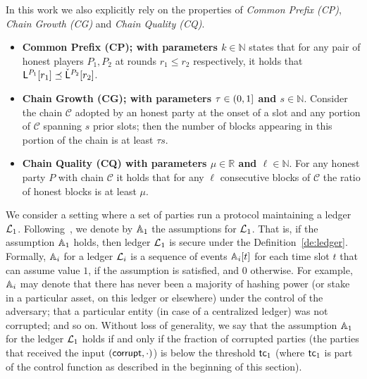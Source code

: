 In this work we also explicitly rely on the properties of \emph{Common Prefix (CP)}, \emph{Chain Growth (CG)} 
and  \emph{Chain Quality (CQ)}. 

\begin{itemize}
  \item[] {\bf Common Prefix (CP); with parameters $k\in\mathbb{N}$} 
states that for any pair of honest players  $P_1,P_2$ at rounds $r_1\leq r_2$ respectively, it holds that  ${ \mathsf{L}}^{P_1}[r_1] \preceq  {\check {\mathsf{L}}}^{P_2}[r_2] $.    
  \item[] {\bf Chain Growth (CG); with parameters $\tau\in (0,1]$ and $s\in\mathbb{N}$}. Consider the chain $\mathcal{C}$
  adopted by an honest party at the onset of a slot and any portion of $\mathcal{C}$ spanning $s$ prior slots; then the number of
  blocks appearing in this portion of the chain is at least $\tau s$.
  
  \item[] {\bf Chain Quality (CQ) with parameters $\mu\in\mathbb{R}$
and $\ell\in\mathbb{N}$}. For any honest party $P$ with chain $\mathcal{C}$  it holds that for any $\ell$ consecutive blocks of $\mathcal{C}$ the ratio of honest blocks is at least $\mu$.
 \end{itemize}



We consider a setting where a set of parties run a protocol maintaining a ledger $\mathcal{L}_1$. Following~\cite{SP:GazKiaZin19}, we denote by $\mathbb{A}_1$
the assumptions for $\mathcal{L}_1$.
 That is, if the assumption $\mathbb{A}_1$ holds, then ledger $\mathcal{L}_1$ is secure under the Definition~\ref{de:ledger}.
Formally, $\mathbb{A}_i$ for a ledger $\mathcal{L}_i$ is a sequence of events $\mathbb{A}_i[t]$ for each time slot $t$ that can assume value $1$,
if the assumption is satisfied, and $0$ otherwise.
For example, $\mathbb{A}_i$ may denote that
there has never been a majority of hashing power (or stake in a particular
asset, on this ledger or elsewhere) under the control of the adversary; that a
particular entity (in case of a centralized ledger) was not corrupted; and so
on.
Without loss of generality, we say that the assumption $\mathbb{A}_1$ for the ledger $\mathcal{L}_1$ holds if and only if the fraction of corrupted parties (the parties
that received the input $(\mathsf{corrupt}, \cdot)$) is below the threshold $\mathsf{tc}_1$ (where $\mathsf{tc}_1$ is part of the control function as described in the beginning
of this section).

